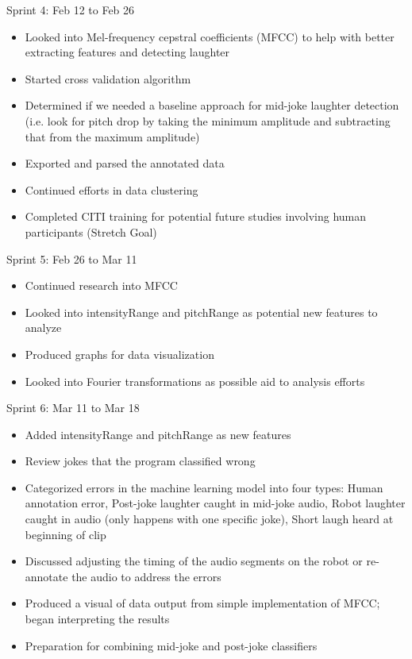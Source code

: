 \documentclass[onecolumn, draftclsnofoot,10pt, compsoc]{IEEEtran}
\begin{document}
Sprint 4: Feb 12 to Feb 26
\begin{itemize}
\item Looked into Mel-frequency cepstral coefficients (MFCC) to help with better extracting features and detecting laughter
\item Started cross validation algorithm
\item Determined if we needed a baseline approach for mid-joke laughter detection (i.e. look for pitch drop by taking the minimum amplitude and subtracting that from the maximum amplitude)
\item Exported and parsed the annotated data
\item Continued efforts in data clustering
\item Completed CITI training for potential future studies involving human participants (Stretch Goal)
\end{itemize}

Sprint 5: Feb 26 to Mar 11
\begin{itemize}
\item Continued research into MFCC
\item Looked into intensityRange and pitchRange as potential new features to analyze
\item Produced graphs for data visualization
\item Looked into Fourier transformations as possible aid to analysis efforts
\end{itemize}
\clearpage
Sprint 6: Mar 11 to Mar 18
\begin{itemize}
\item Added intensityRange and pitchRange as new features
\item Review jokes that the program classified wrong
\item Categorized errors in the machine learning model into four types: Human annotation error, Post-joke laughter caught in mid-joke audio, Robot laughter caught in audio (only happens with one specific joke), Short laugh heard at beginning of clip
\item Discussed adjusting the timing of the audio segments on the robot or re-annotate the audio to address the errors
\item Produced a visual of data output from simple implementation of MFCC; began interpreting the results
\item Preparation for combining mid-joke and post-joke classifiers
\end{itemize}
\end{document}

